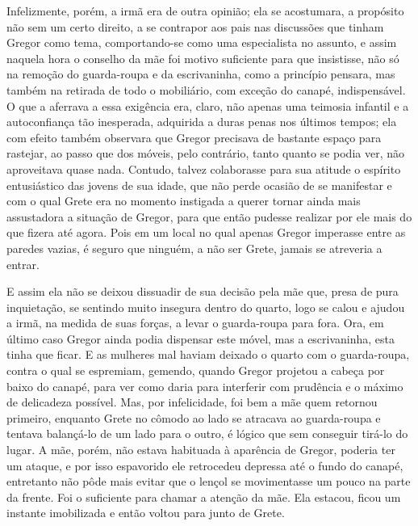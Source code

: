 Infelizmente, porém, a irmã era de outra opinião; ela se acostumara, a
propósito não sem um certo direito, a se contrapor aos pais nas discussões
que tinham Gregor como tema, comportando-se como uma especialista no
assunto, e assim naquela hora o conselho da mãe foi motivo suficiente para
que insistisse, não só na remoção do guarda-roupa e da escrivaninha, como
a princípio pensara, mas também na retirada de todo o mobiliário, com
exceção do canapé, indispensável. O que a aferrava a essa exigência era,
claro, não apenas uma teimosia infantil e a autoconfiança tão inesperada,
adquirida a duras penas nos últimos tempos; ela com efeito também
observara que Gregor precisava de bastante espaço para rastejar, ao passo
que dos móveis, pelo contrário, tanto quanto se podia ver, não aproveitava
quase nada. Contudo, talvez colaborasse para sua atitude  o espírito
entusiástico das jovens de sua idade, que não perde ocasião de se
manifestar e com o qual Grete era no momento instigada a querer tornar
ainda mais assustadora a situação de Gregor, para que então pudesse
realizar por ele mais do que fizera até agora. Pois em um local no qual
apenas Gregor imperasse entre as paredes vazias, é seguro que ninguém, a
não ser Grete, jamais se atreveria a entrar.

E assim ela não se deixou dissuadir de sua decisão pela mãe que, presa de
pura inquietação, se sentindo muito insegura dentro do quarto, logo se
calou e ajudou a irmã, na medida de suas forças, a levar o guarda-roupa
para fora. Ora, em último caso Gregor ainda podia dispensar este móvel,
mas a escrivaninha, esta tinha que ficar. E as mulheres mal haviam deixado
o quarto com o guarda-roupa, contra o qual se espremiam, gemendo, quando
Gregor projetou a cabeça por baixo do canapé, para ver como daria para
interferir com prudência e o máximo de delicadeza possível. Mas, por
infelicidade, foi bem a mãe quem retornou primeiro, enquanto Grete no
cômodo ao lado se atracava ao guarda-roupa e tentava balançá-lo de um lado
para o outro, é lógico que sem conseguir tirá-lo do lugar. A mãe, porém,
não estava habituada à aparência de Gregor, poderia ter um ataque, e por
isso espavorido ele retrocedeu depressa até o fundo do canapé, entretanto
não pôde mais evitar que o lençol se movimentasse um pouco na parte da
frente. Foi o suficiente para chamar a atenção da mãe. Ela estacou, ficou
um instante imobilizada e então voltou para junto de Grete.

